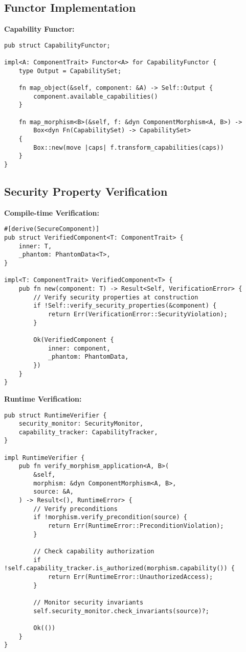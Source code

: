 \subsection{Functor Implementation}

\textbf{Capability Functor:}
\begin{lstlisting}[style=rust]
pub struct CapabilityFunctor;

impl<A: ComponentTrait> Functor<A> for CapabilityFunctor {
    type Output = CapabilitySet;
    
    fn map_object(&self, component: &A) -> Self::Output {
        component.available_capabilities()
    }
    
    fn map_morphism<B>(&self, f: &dyn ComponentMorphism<A, B>) -> 
        Box<dyn Fn(CapabilitySet) -> CapabilitySet> 
    {
        Box::new(move |caps| f.transform_capabilities(caps))
    }
}
\end{lstlisting}

\subsection{Security Property Verification}

\textbf{Compile-time Verification:}
\begin{lstlisting}[style=rust]
#[derive(SecureComponent)]
pub struct VerifiedComponent<T: ComponentTrait> {
    inner: T,
    _phantom: PhantomData<T>,
}

impl<T: ComponentTrait> VerifiedComponent<T> {
    pub fn new(component: T) -> Result<Self, VerificationError> {
        // Verify security properties at construction
        if !Self::verify_security_properties(&component) {
            return Err(VerificationError::SecurityViolation);
        }
        
        Ok(VerifiedComponent {
            inner: component,
            _phantom: PhantomData,
        })
    }
}
\end{lstlisting}

\textbf{Runtime Verification:}
\begin{lstlisting}[style=rust]
pub struct RuntimeVerifier {
    security_monitor: SecurityMonitor,
    capability_tracker: CapabilityTracker,
}

impl RuntimeVerifier {
    pub fn verify_morphism_application<A, B>(
        &self,
        morphism: &dyn ComponentMorphism<A, B>,
        source: &A,
    ) -> Result<(), RuntimeError> {
        // Verify preconditions
        if !morphism.verify_precondition(source) {
            return Err(RuntimeError::PreconditionViolation);
        }
        
        // Check capability authorization
        if !self.capability_tracker.is_authorized(morphism.capability()) {
            return Err(RuntimeError::UnauthorizedAccess);
        }
        
        // Monitor security invariants
        self.security_monitor.check_invariants(source)?;
        
        Ok(())
    }
}
\end{lstlisting}

